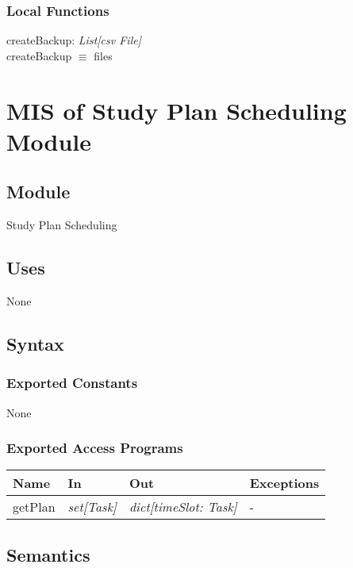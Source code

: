 \documentclass[12pt, titlepage]{article}
\begin{document}
\subsubsection{Local Functions}
\noindent createBackup:  \textit{List[csv File]} \\
\noindent createBackup $\equiv$ files


\newpage

\section{MIS of Study Plan Scheduling Module} \label{StudyPlanSchedulingModule}

\subsection{Module}
Study Plan Scheduling

\subsection{Uses}
None

\subsection{Syntax}

\subsubsection{Exported Constants}
None

\subsubsection{Exported Access Programs}

\begin{center}
\begin{tabular}{p{4cm} p{3cm} p{3cm} p{3cm}}
\hline
\textbf{Name} & \textbf{In} & \textbf{Out} & \textbf{Exceptions} \\
\hline
getPlan&  \textit{set[Task]} & \textit{dict[timeSlot: Task]} & - \\
\hline
\end{tabular}
\end{center}

\subsection{Semantics}
\end{document}
